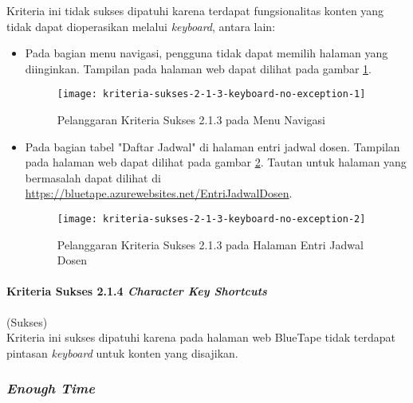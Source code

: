 Kriteria ini tidak sukses dipatuhi karena terdapat fungsionalitas konten yang tidak dapat dioperasikan melalui \textit{keyboard}, antara lain:

\begin{itemize}
    \item Pada bagian menu navigasi, pengguna tidak dapat memilih halaman yang diinginkan. Tampilan pada halaman web dapat dilihat pada gambar \ref{fig:2.1.3_keyboard_no_exception_1}.
    \begin{figure}[H]
        \centering  
        \texttt{[image: kriteria-sukses-2-1-3-keyboard-no-exception-1]}  
        \caption[Pelanggaran Kriteria Sukses 2.1.3 pada Menu Navigasi]{Pelanggaran Kriteria Sukses 2.1.3 pada Menu Navigasi}
        \label{fig:2.1.3_keyboard_no_exception_1}  
    \end{figure} 

    \item Pada bagian tabel "Daftar Jadwal" di halaman entri jadwal dosen. Tampilan pada halaman web dapat dilihat pada gambar \ref{fig:2.1.3_keyboard_no_exception_2}. Tautan untuk halaman yang bermasalah dapat dilihat di \url{https://bluetape.azurewebsites.net/EntriJadwalDosen}.
    \begin{figure}[H]
        \centering  
        \texttt{[image: kriteria-sukses-2-1-3-keyboard-no-exception-2]}  
        \caption[Pelanggaran Kriteria Sukses 2.1.3 pada Halaman Entri Jadwal Dosen]{Pelanggaran Kriteria Sukses 2.1.3 pada Halaman Entri Jadwal Dosen}
        \label{fig:2.1.3_keyboard_no_exception_2}  
    \end{figure} 
\end{itemize}

\paragraph{Kriteria Sukses 2.1.4 \textit{Character Key Shortcuts}}
\label{par:kepatuhan_bluetape_kriteria_sukses_2.1.4}
(Sukses)\\

Kriteria ini sukses dipatuhi karena pada halaman web BlueTape tidak terdapat pintasan \textit{keyboard} untuk konten yang disajikan.

\subsubsection{\textit{Enough Time}}
\label{subsubsec:kepatuhan_bluetape_enough_time}

